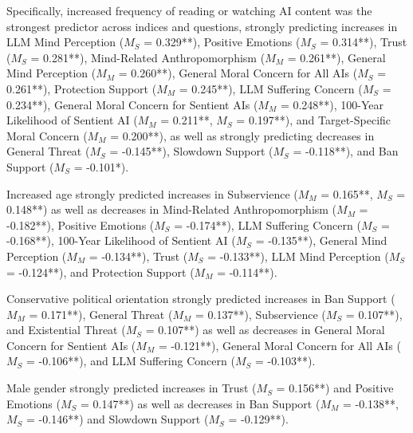 \documentclass[manuscript,screen,review,nonacm]{acmart}
\begin{document}
Specifically, increased frequency of reading or watching AI content was the strongest predictor across indices and questions, strongly predicting increases in LLM Mind Perception ($M_S$ = 0.329**), Positive Emotions ($M_S$ = 0.314**), Trust ($M_S$ = 0.281**), Mind-Related Anthropomorphism ($M_M$ = 0.261**), General Mind Perception ($M_M$ = 0.260**), General Moral Concern for All AIs ($M_S$ = 0.261**), Protection Support ($M_M$ = 0.245**), LLM Suffering Concern ($M_S$ = 0.234**), General Moral Concern for Sentient AIs ($M_M$ = 0.248**), 100-Year Likelihood of Sentient AI ($M_M$ = 0.211**, $M_S$ = 0.197**), and Target-Specific Moral Concern ($M_M$ = 0.200**), as well as strongly predicting decreases in General Threat ($M_S$ = -0.145**), Slowdown Support ($M_S$ = -0.118**), and Ban Support ($M_S$ = -0.101*).

Increased age strongly predicted increases in Subservience ($M_M$ = 0.165**, $M_S$ = 0.148**) as well as decreases in Mind-Related Anthropomorphism ($M_M$ = -0.182**), Positive Emotions ($M_S$ = -0.174**), LLM Suffering Concern ($M_S$ = -0.168**), 100-Year Likelihood of Sentient AI ($M_S$ = -0.135**), General Mind Perception ($M_M$ = -0.134**), Trust ($M_S$ = -0.133**), LLM Mind Perception ($M_S$ = -0.124**), and Protection Support ($M_M$ = -0.114**).
 
Conservative political orientation strongly predicted increases in Ban Support ($M_M$ = 0.171**), General Threat ($M_M$ = 0.137**), Subservience ($M_S$ = 0.107**), and Existential Threat ($M_S$ = 0.107**) as well as decreases in General Moral Concern for Sentient AIs ($M_M$ = -0.121**), General Moral Concern for All AIs ($M_S$ = -0.106**), and LLM Suffering Concern ($M_S$ = -0.103**).

Male gender strongly predicted increases in Trust ($M_S$ = 0.156**) and Positive Emotions ($M_S$ = 0.147**) as well as decreases in Ban Support ($M_M$ = -0.138**, $M_S$ = -0.146**) and Slowdown Support ($M_S$ = -0.129**).



\end{document}
